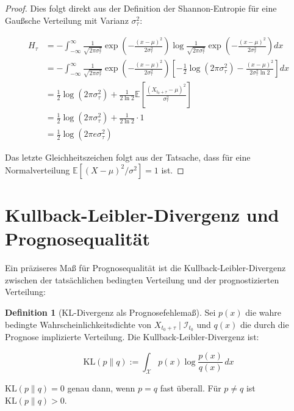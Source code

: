 \documentclass[12pt, a4paper, titlepage]{report}
\theoremstyle{definition}
\newtheorem{definition}[theorem]{Definition}
\theoremstyle{remark}
\newcommand{\E}{\mathbb{E}}
\newcommand{\KL}{\mathrm{KL}}
\begin{document}
\begin{proof}
Dies folgt direkt aus der Definition der Shannon-Entropie für eine Gaußsche Verteilung mit Varianz $\sigma_\tau^2$:

\begin{align}
H_\tau &= -\int_{-\infty}^{\infty} \frac{1}{\sqrt{2\pi\sigma_\tau^2}} \exp\left( -\frac{(x-\mu)^2}{2\sigma_\tau^2} \right) \log \frac{1}{\sqrt{2\pi\sigma_\tau^2}} \exp\left( -\frac{(x-\mu)^2}{2\sigma_\tau^2} \right) dx \\
&= -\int_{-\infty}^{\infty} \frac{1}{\sqrt{2\pi\sigma_\tau^2}} \exp\left( -\frac{(x-\mu)^2}{2\sigma_\tau^2} \right) \left[ -\frac{1}{2}\log(2\pi\sigma_\tau^2) - \frac{(x-\mu)^2}{2\sigma_\tau^2\ln 2} \right] dx \\
&= \frac{1}{2}\log(2\pi\sigma_\tau^2) + \frac{1}{2\ln 2} \E\left[ \frac{(X_{t_0+\tau}-\mu)^2}{\sigma_\tau^2} \right] \\
&= \frac{1}{2}\log(2\pi\sigma_\tau^2) + \frac{1}{2\ln 2} \cdot 1 \\
&= \frac{1}{2} \log(2\pi e \sigma_\tau^2)
\end{align}

Das letzte Gleichheitszeichen folgt aus der Tatsache, dass für eine Normalverteilung $\E[(X-\mu)^2/\sigma^2] = 1$ ist.
\end{proof}

\section{Kullback-Leibler-Divergenz und Prognosequalität}

Ein präziseres Maß für Prognosequalität ist die Kullback-Leibler-Divergenz zwischen der tatsächlichen bedingten Verteilung und der prognostizierten Verteilung:

\begin{definition}[KL-Divergenz als Prognosefehlemaß]
Sei $p(x)$ die wahre bedingte Wahrscheinlichkeitsdichte von $X_{t_0+\tau} \mid \mathcal{I}_{t_0}$ und $q(x)$ die durch die Prognose implizierte Verteilung. Die Kullback-Leibler-Divergenz ist:

\begin{equation}
\KL(p \parallel q) := \int_{\mathcal{X}} p(x) \log \frac{p(x)}{q(x)} \, dx
\label{eq:kl}
\end{equation}

$\KL(p \parallel q) = 0$ genau dann, wenn $p = q$ fast überall. Für $p \neq q$ ist $\KL(p \parallel q) > 0$.
\end{definition}
\end{document}
